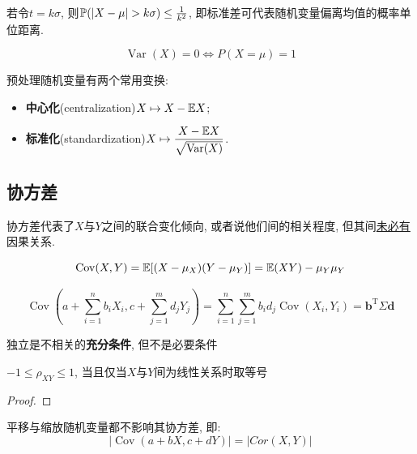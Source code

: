 \begin{remark}
    若令$t=k\sigma$, 则$\P(| X-\mu | >k\sigma)\le \frac1{k^{2}}$, 即标准差可代表随机变量偏离均值的概率单位距离.
\end{remark}

\begin{corollary}
    \[ \operatorname{Var}(X)=0 \Leftrightarrow P(X=\mu)=1 \]
\end{corollary}

预处理随机变量有两个常用变换:
\begin{itemize}
    \item \textbf{中心化}(centralization)$X \mapsto X-\E{X}$;
    \item \textbf{标准化}(standardization)$X \mapsto \dfrac{X-\E{X}}{\sqrt{\Var(X)}}$.
\end{itemize}

\subsection{协方差}

协方差代表了$X$与$Y$之间的联合变化倾向, 或者说他们间的相关程度, 但其间\underline{未必有}因果关系.

\begin{theorem}
    \[ \operatorname{Cov} (X,Y)=\E[(X-\mu_X)(Y-\mu_Y)]=\E(XY)-\mu_Y \mu_Y \]
\end{theorem}

\begin{theorem}
    \[ \operatorname{Cov}(a+\sum_{i=1}^n b_i X_i,c+\sum_{j=1}^m d_j Y_j) = \sum_{i=1}^n\sum_{j=1}^m b_i d_j \operatorname{Cov}(X_i,Y_i) = \mathbf{b}^{\mathrm{T}}\Sigma \mathbf{d}\]
\end{theorem}

\begin{theorem}
    独立是不相关的\textbf{充分条件}, 但不是必要条件
\end{theorem}

\begin{theorem}
    $-1\le \rho_{XY} \le 1$, 当且仅当$X$与$Y$间为线性关系时取等号
\end{theorem}

\begin{proof}
\end{proof}

\begin{theorem}
    平移与缩放随机变量都不影响其协方差, 即:
    \[ \left| \operatorname{Cov}(a+ b X,c +d Y) \right| = \left| Cor(X,Y) \right|  \]
\end{theorem}

